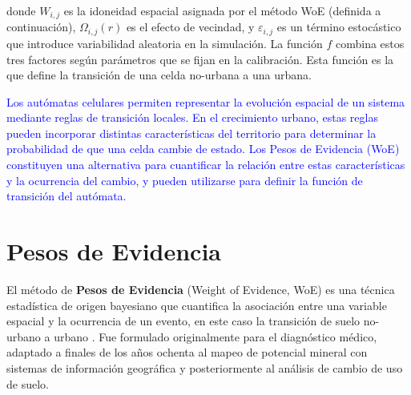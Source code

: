 donde $W_{i,j}$ es la idoneidad espacial asignada por el método WoE (definida a continuación), $\Omega_{i,j}(r)$ es el efecto de vecindad, y $\varepsilon_{i,j}$ es un término estocástico que introduce variabilidad aleatoria en la simulación. La función $f$ combina estos tres factores según parámetros que se fijan en la calibración. Esta función es la que define la transición de una celda no-urbana a una urbana.



\textcolor{blue}{Los autómatas celulares permiten representar la evolución espacial de un sistema mediante reglas de transición locales. En el crecimiento urbano, estas reglas pueden incorporar distintas características del territorio para determinar la probabilidad de que una celda cambie de estado. Los Pesos de Evidencia (WoE) constituyen una alternativa para cuantificar la relación entre estas características y la ocurrencia del cambio, y pueden utilizarse para definir la función de transición del autómata.}


\section{Pesos de Evidencia}
\label{sec:woe}

El método de \textbf{Pesos de Evidencia} (Weight of Evidence, WoE) es una técnica estadística de origen bayesiano que cuantifica la asociación entre una variable espacial y la ocurrencia de un evento, en este caso la transición de suelo no-urbano a urbano \parencite{BonhamCarter1994}. Fue formulado originalmente para el diagnóstico médico, adaptado a finales de los años ochenta al mapeo de potencial mineral con sistemas de información geográfica \parencite{BonhamCarter1989} y posteriormente al análisis de cambio de uso de suelo.

